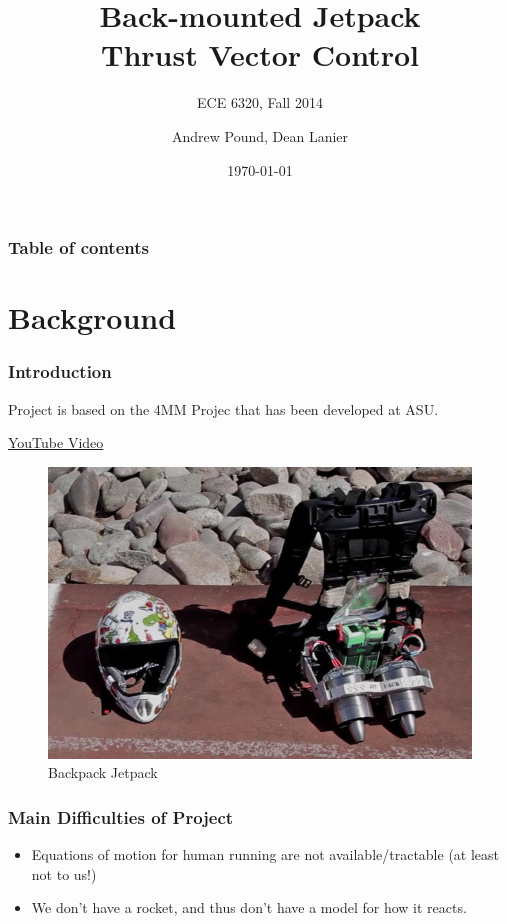 \documentclass[dvipsnames,usenames]{beamer}
\institute[ECE Department]{\hfill Department of Electrical and
  Computer Engineering}
\title{Back-mounted Jetpack \\
Thrust Vector Control\\}
\subtitle{
ECE 6320, Fall 2014
}
\author{Andrew Pound, Dean Lanier}
\date{\today}
\begin{document}

\frame[plain]{\titlepage}

\begin{frame}
\frametitle{Table of contents}
\tableofcontents
\end{frame}

\section{Background}

\begin{frame}
\frametitle{Introduction}  
Project is based on the 4MM Projec that has been developed 
at ASU.

\vspace{1em}
\href{https://www.youtube.com/watch?v=vJSbd8ttLoU}{YouTube Video}
\vspace{1em}
\begin{figure}
  \centering
  \includegraphics[width=.5\linewidth]{../figs/jetpack}
  \caption{Backpack Jetpack}
\end{figure}

\end{frame}

\begin{frame}
  \frametitle{Main Difficulties of Project}
  \begin{itemize}
  \item Equations of motion for human running are not
    available/tractable (at least not to us!)
  \vspace{3em}
  \item We don't have a rocket, and thus don't have  a model for how
    it reacts.
  \end{itemize}
\end{frame}
\end{document}
